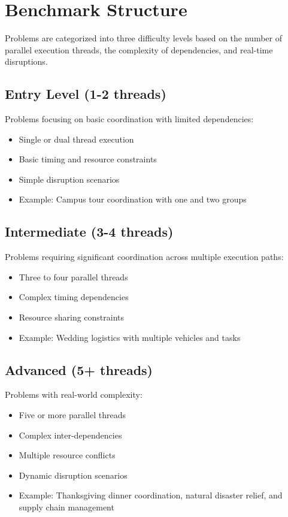 \section{Benchmark Structure}

Problems are categorized into three difficulty levels based on the number of parallel execution threads, the complexity of dependencies, and real-time disruptions.

\subsection{Entry Level (1-2 threads)}
Problems focusing on basic coordination with limited dependencies:
\begin{itemize}[leftmargin=1.0em, topsep=-.0em, parsep=-.0em, label=-]
   \item Single or dual thread execution
   \item Basic timing and resource constraints
   \item Simple disruption scenarios
   \item Example: Campus tour coordination with one and two groups
\end{itemize}

\subsection{Intermediate (3-4 threads)}
Problems requiring significant coordination across multiple execution paths:
\begin{itemize}[leftmargin=1.0em, topsep=-.0em, parsep=-.0em, label=-]
   \item Three to four parallel threads
   \item Complex timing dependencies
   \item Resource sharing constraints
   \item Example: Wedding logistics with multiple vehicles and tasks
\end{itemize}

\subsection{Advanced (5+ threads)}
Problems with real-world complexity:
\begin{itemize}[leftmargin=1.0em, topsep=-.0em, parsep=-.0em, label=-]
   \item Five or more parallel threads
   \item Complex inter-dependencies
   \item Multiple resource conflicts
   \item Dynamic disruption scenarios
   \item Example: Thanksgiving dinner coordination, natural disaster relief, and supply chain management
\end{itemize}

